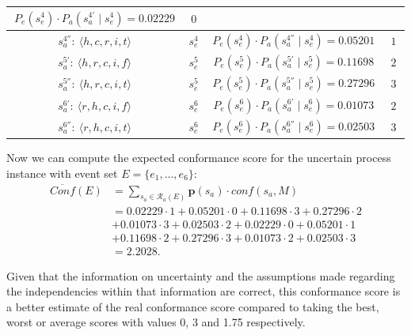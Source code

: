 \begin{table}[h]
\begin{tabular}{cccc}
	\multicolumn{1}{|c|}{$~ P_e(s_e^4) \cdot P_a(s_a^{4'} \mid s_e^4) = 0.02229 ~$} &
	\multicolumn{1}{|c|}{$~ 0 ~$}
\\ \hline
	\multicolumn{1}{|c|}{$s_a^{4''}: ~ \langle h,c,r,i,t \rangle$} & 
	\multicolumn{1}{|c|}{$s_e^4$} & 
	\multicolumn{1}{|c|}{$~ P_e(s_e^4) \cdot P_a(s_a^{4''} \mid s_e^4) = 0.05201~$} &
	\multicolumn{1}{|c|}{$~ 1 ~$}
\\ \hline
	\multicolumn{1}{|c|}{$s_a^{5'}: ~ \langle h,r,c,i,f\rangle$} & 
	\multicolumn{1}{|c|}{$s_e^5$} & 
	\multicolumn{1}{|c|}{$~ P_e(s_e^5) \cdot P_a(s_a^{5'} \mid s_e^5) = 0.11698~$} &
	\multicolumn{1}{|c|}{$~ 2 ~$}
\\ \hline
	\multicolumn{1}{|c|}{$s_a^{5''}: ~ \langle h,r,c,i,t\rangle$} & 
	\multicolumn{1}{|c|}{$s_e^5$} & 
	\multicolumn{1}{|c|}{$~ P_e(s_e^5) \cdot P_a(s_a^{5''} \mid s_e^5) = 0.27296~$} &
	\multicolumn{1}{|c|}{$~ 3 ~$}
\\ \hline
	\multicolumn{1}{|c|}{$s_a^{6'}: ~ \langle r,h,c,i,f\rangle$} & 
	\multicolumn{1}{|c|}{$s_e^6$} & 
	\multicolumn{1}{|c|}{$~ P_e(s_e^6) \cdot P_a(s_a^{6'} \mid s_e^6) = 0.01073~$} &
	\multicolumn{1}{|c|}{$~ 2 ~$}
\\ \hline
	\multicolumn{1}{|c|}{$s_a^{6''}: ~ \langle r,h,c,i,t\rangle$} & 
	\multicolumn{1}{|c|}{$s_e^6$} & 
	\multicolumn{1}{|c|}{$~ P_e(s_e^6) \cdot P_a(s_a^{6''} \mid s_e^6) = 0.02503~$} &
	\multicolumn{1}{|c|}{$~ 3 ~$}
\\ \hline
	\end{tabular}
	\label{table: p values}
\end{table} 
% 
%
%
Now we can compute the expected conformance score for the uncertain process instance with event set $E=\{e_1,...,e_6\}$:
\begin{align*}
\overline{Conf}(E) &= \sum_{s_a \in \mathcal{R}_a(E)} \textbf{p}(s_a) \cdot conf(s_a,M) \\
&= 0.02229 \cdot 1 + 0.05201 \cdot 0 + 0.11698 \cdot 3 + 0.27296 \cdot 2 \\ 
&+ 0.01073 \cdot 3 + 0.02503 \cdot 2 +
0.02229 \cdot 0 + 0.05201 \cdot 1 \\
&+ 0.11698 \cdot 2 + 0.27296 \cdot 3 + 0.01073 \cdot 2 + 0.02503 \cdot 3 \\
&= 2.2028.
\end{align*}

Given that the information on uncertainty and the assumptions made regarding the independencies within that information are correct, this conformance score is a better estimate of the real conformance score compared to taking the best, worst or average scores with values 0, 3 and 1.75 respectively. 



